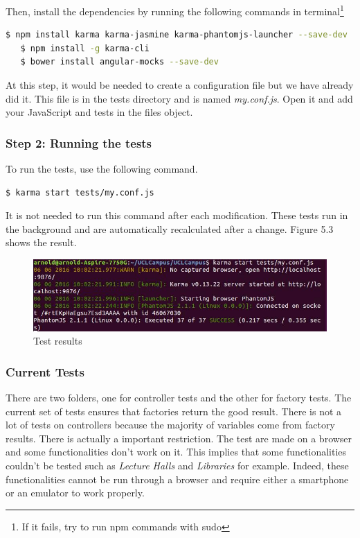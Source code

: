 \documentclass{eplmastersthesis}
\begin{document}
Then, install the dependencies by running the following commands in terminal\footnote{If it fails, try to run npm commands with sudo}
\begin{lstlisting}[language=bash]
   $ npm install karma karma-jasmine karma-phantomjs-launcher --save-dev
   $ npm install -g karma-cli
   $ bower install angular-mocks --save-dev
\end{lstlisting}
At this step, it would be needed to create a configuration file but we have already did it. This file is in the tests directory and is named \textit{my.conf.js}. Open it and add your JavaScript and tests in the files object.
\subsubsection{Step 2: Running the tests} 
To run the tests, use the following command.
\begin{lstlisting}[language=bash]
   $ karma start tests/my.conf.js
\end{lstlisting}
It is not needed to run this command after each modification. These tests run in the background and are automatically recalculated after a change. Figure 5.3 shows the result.
\begin{figure}[H]
\centering
\includegraphics[scale = 0.7]{Images/tests.png}
\caption{Test results}
\end{figure}

\subsubsection{Current Tests}
There are two folders, one for controller tests and the other for factory tests. The current set of tests ensures that factories return the good result. There is not a lot of tests on controllers because the majority of variables come from factory results. There is actually a important restriction. The test are made on a browser and some functionalities don't work on it. This implies that some functionalities couldn't be tested such as \textit{Lecture Halls} and\textit{ Libraries }for example. Indeed, these functionalities cannot be run through a browser and require either a smartphone or an emulator to work properly. 
\end{document}
